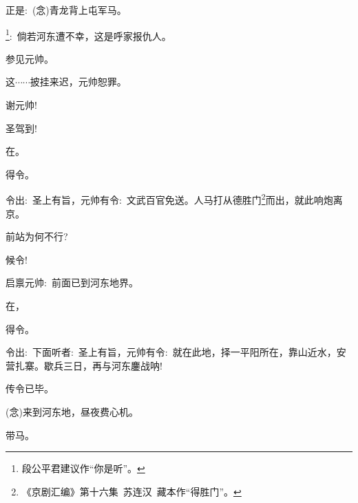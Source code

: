 {{正是:~({\akai 念})青龙背上屯军马。}




\footnote{段公平{\scriptsize 君}建议作``你是听''。}{:~倘若河东遭不幸，这是呼家报仇人。}



\vspace{5pt}

{参见元帅。}

{这$\cdots{}\cdots{}$披挂来迟，元帅恕罪。}

{谢元帅!}

{圣驾到!}

{在。}

{得令。}

{令出:~圣上有旨，元帅有令:~文武百官免送。人马打从德胜门}\footnote{《京剧汇编》第十六集~苏连汉~藏本作``得胜门''。}{而出，就此响炮离京。}

{\vspace{5pt}}

{前站为何不行?}

{候令!}

{启禀元帅:~前面已到河东地界。}

{在，}

{得令。}

{令出:~下面听者:~圣上有旨，元帅有令:~就在此地，择一平阳所在，靠山近水，安营扎寨。歇兵三日，再与河东鏖战呐!}

{传令已毕。}

{\vspace{5pt}}

{({\akai 念})来到河东地，昼夜费心机。}

{带马。}

}
